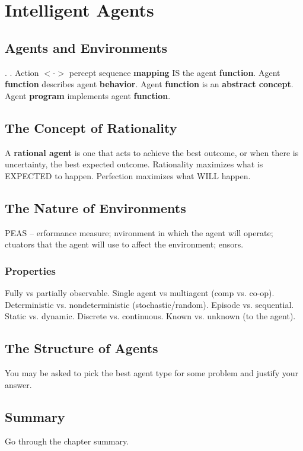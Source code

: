 \documentclass[exam={Midterm},color=true]{cs581exam}
\renewcommand{\emph}[1]{\textbf{#1}}
\begin{document}
\section{Intelligent Agents}\label{sec:intelligent-agents}
\subsection{Agents and Environments}\label{subsec:2.1}
.
.
Action $<$-$>$ percept sequence \emph{mapping} IS the agent \emph{function}.
Agent \emph{function} describes agent \emph{behavior}.
Agent \emph{function} is an \emph{abstract concept}.
Agent \emph{program} implements agent \emph{function}.

\subsection{The Concept of Rationality}\label{subsec:2.2}
A \emph{rational agent} is one that acts to achieve the best outcome, or when there is uncertainty, the best expected outcome.
Rationality maximizes what is EXPECTED to happen.
Perfection maximizes what WILL happen.
%
\subsection{The Nature of Environments}\label{subsec:2.3}
PEAS -- \Peas{}erformance measure;
\pEas{}nvironment in which the agent will operate;
\peAs{}ctuators that the agent will use to affect the environment;
\peaS{}ensors.
\subsubsection{Properties}\label{subsubsec:properties}
Fully vs partially observable.
Single agent vs multiagent (comp vs. co-op).
Deterministic vs. nondeterministic (stochastic/random).
Episode vs. sequential.
Static vs. dynamic.
Discrete vs. continuous.
Known vs. unknown (to the agent).
%
\subsection{The Structure of Agents}\label{subsec:2.4}
You may be asked to pick the best agent type for some problem and justify
your answer.
%
\subsection{Summary}\label{subsec:2-summary}
Go through the chapter summary.
\end{document}

